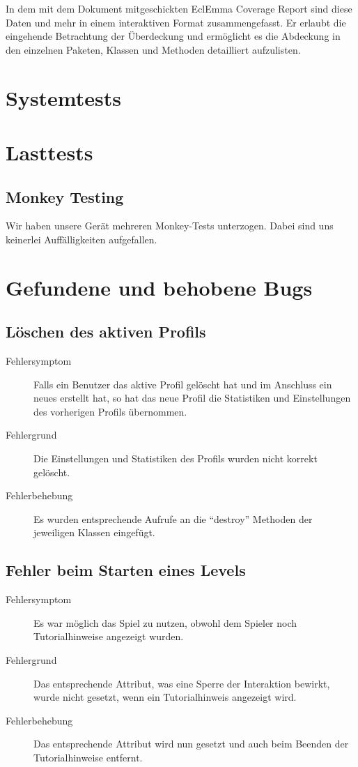 \documentclass[parskip=full]{scrreprt}
\begin{document}
In dem mit dem Dokument mitgeschickten EclEmma Coverage Report sind diese Daten und mehr in einem interaktiven Format zusammengefasst. 
Er erlaubt die eingehende Betrachtung der Überdeckung und ermöglicht es die Abdeckung in den einzelnen Paketen, Klassen und Methoden detailliert aufzulisten.

\chapter{Systemtests}

\chapter{Lasttests}

\section{Monkey Testing}

Wir haben unsere Gerät mehreren Monkey-Tests unterzogen. Dabei sind uns keinerlei Auffälligkeiten aufgefallen.

\chapter{Gefundene und behobene Bugs}

\section{Löschen des aktiven Profils}
\begin{description}
	\item[Fehlersymptom] Falls ein Benutzer das aktive Profil gelöscht hat und im Anschluss ein neues erstellt hat, so hat das neue Profil die Statistiken und Einstellungen des vorherigen Profils übernommen.
	\item[Fehlergrund] Die Einstellungen und Statistiken des Profils wurden nicht korrekt gelöscht.
	\item[Fehlerbehebung] Es wurden entsprechende Aufrufe an die \enquote{destroy} Methoden der jeweiligen Klassen eingefügt.
\end{description}

\section{Fehler beim Starten eines Levels}
\begin{description}
	\item[Fehlersymptom] Es war möglich das Spiel zu nutzen, obwohl dem Spieler noch Tutorialhinweise angezeigt wurden.
	\item[Fehlergrund] Das entsprechende Attribut, was eine Sperre der Interaktion bewirkt, wurde nicht gesetzt, wenn ein Tutorialhinweis angezeigt wird.
	\item[Fehlerbehebung] Das entsprechende Attribut wird nun gesetzt und auch beim Beenden der Tutorialhinweise entfernt.
\end{description}
\end{document}
